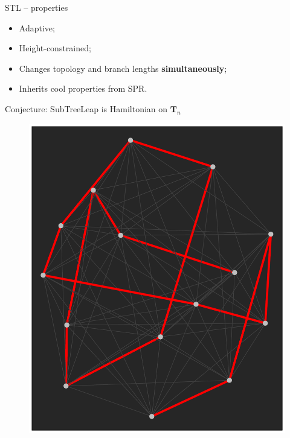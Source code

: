 \documentclass[newPxFont,numfooter,sectionpages]{beamer}
\begin{document}
\begin{frame}{STL -- properties}
\begin{itemize}
 \item Adaptive;
 \item Height-constrained;
 \item Changes topology and branch lengths \textbf{simultaneously};
 \item Inherits cool properties from SPR.
\end{itemize}
\end{frame}

\begin{frame}{Conjecture: SubTreeLeap is Hamiltonian on $\boldsymbol T_n$ }
\begin{figure}
	\includegraphics[scale=0.35]{figures/hamiltonian_SPR_4taxa.pdf} 
\end{figure}

\end{frame}
\end{document}
